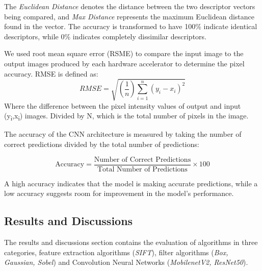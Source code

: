The \textit{Euclidean Distance} denotes the distance between the two descriptor vectors being compared, and \textit{Max Distance} represents the maximum Euclidean distance found in the vector. The accuracy is transformed to have 100\% indicate identical descriptors, while 0\% indicates completely dissimilar descriptors.

We used root mean square error (RSME) to compare the input image to the output images produced by each hardware accelerator to determine the pixel accuracy. RMSE is defined as:
\begin{equation}
RMSE = \sqrt{(\frac{1}{n})\sum_{i=1}^{n}(y_{i} - x_{i})^{2}}
\end{equation}
Where the difference between the pixel intensity values of output and input (y\textsubscript{i},x\textsubscript{i}) images. Divided by N, which is the total number of pixels in the image.\par


The accuracy of the CNN architecture is measured by taking the number of correct predictions divided by the total number of predictions:

\begin{equation}
\text{Accuracy} = \frac{\text{Number of Correct Predictions}}{\text{Total Number of Predictions}} \times 100
\end{equation}

A high accuracy indicates that the model is making accurate predictions, while a low accuracy suggests room for improvement in the model's performance. 









\subsection{Results and Discussions}
The results and discussions section contains the evaluation of algorithms in three categories, feature extraction algorithms (\textit{SIFT}), filter algorithms (\textit{Box, Gaussian, Sobel}) and Convolution Neural Networks (\textit{MobilenetV2, ResNet50}). 

 


